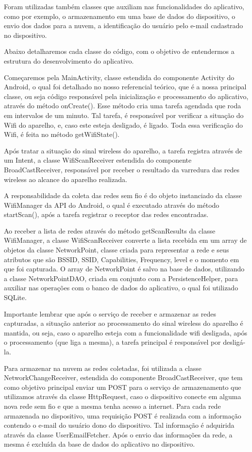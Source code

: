 \documentclass[12pt, %
openright, 
oneside,
a4paper,
brazil]{facom-ufu-abntex2}
\begin{document}
Foram utilizadas também classes que auxiliam nas funcionalidades do aplicativo, como por exemplo, o armazenamento em uma base de dados do dispositivo, o envio dos dados para a nuvem, a identificação do usuário pelo e-mail cadastrado no dispositivo.

Abaixo detalharemos cada classe do código, com o objetivo de entendermos a estrutura do desenvolvimento do aplicativo.

Começaremos pela MainActivity, classe estendida do componente Activity do Android, o qual foi detalhado no nosso referencial teórico, que é a nossa principal classe, ou seja código responsável pela inicialização e processamento do aplicativo, através do método onCreate(). Esse método cria uma tarefa agendada que roda em intervalos de um minuto. Tal tarefa, é responsável por verificar a situação do Wifi do aparelho, e, caso este esteja desligado, é ligado. Toda essa verificação do Wifi, é feita no método getWifiState().

  Após tratar a situação do sinal wireless do aparelho, a tarefa registra através de um Intent, a classe WifiScanReceiver estendida do componente BroadCastReceiver, responsável por receber o resultado da varredura das redes wireless ao alcance do aparelho realizada.
 
 A responsabilidade da coleta das redes sem fio é do objeto instanciado da classe WifiManager da API do Android, o qual é executado através do método startScan(), após a tarefa registrar o receptor das redes encontradas.
 
  Ao receber a lista de redes através do método getScanResults da classe WifiManager, a classe WifiScanReceiver converte a lista recebida em um array de objetos da classe NetworkPoint, classe criada para representar a rede e seus atributos que são BSSID, SSID, Capabilities, Frequency, level e o momento em que foi capturada. O array de NetworkPoint é salvo na base de dados, utilizando a classe NetworkPointDAO, criada em conjunto com a PersistenceHelper, para auxiliar nas operações com o banco de dados do aplicativo, o qual foi utilizado SQLite.
 
 Importante lembrar que após o serviço de receber e armazenar as redes capturadas, a situação anterior ao processamento do sinal wireless do aparelho é mantida, ou seja, caso o aparelho esteja com a funcionalidade wifi desligada, após o processamento (que liga a mesma), a tarefa principal é responsável por desligá-la. 
 
  Para armazenar na nuvem as redes coletadas, foi utilizada a classe NetworkChangeReceiver, estendida do componente BroadCastReceiver, que tem como objetivo principal enviar um POST para o serviço de armazenamento que utilizamos através da classe HttpRequest, caso o dispositivo conecte em alguma nova rede sem fio e que a mesma tenha acesso a internet. Para cada rede armazenada no dispositivo, uma requisição POST é realizada com a informação contendo o e-mail do usuário dono do dispositivo. Tal informação é adquirida através da classe UserEmailFetcher.  Após o envio das informações da rede, a mesma é excluída da base de dados do aplicativo no dispositivo.
  
\end{document}
